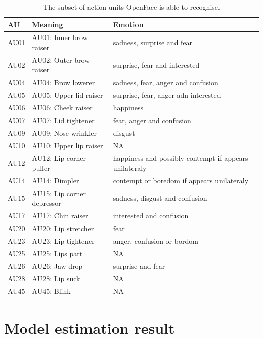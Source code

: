 \documentclass{monashthesis}
\begin{document}
\begin{table}[ht]
\begin{center}
\caption{\label{tab:au} The subset of action units OpenFace is able to recognise.}
\begin{tabular}{lll}
\toprule
AU & Meaning & Emotion \\
\midrule
AU01 & AU01: Inner brow raiser & sadness, surprise and fear \\
AU02 & AU02: Outer brow raiser & surprise, fear and interested \\
AU04 & AU04: Brow lowerer & sadness, fear, anger and confusion \\
AU05 & AU05: Upper lid raiser & surprise, fear, anger adn interested \\
AU06 & AU06: Cheek raiser & happiness \\
AU07 & AU07: Lid tightener & fear, anger and confusion \\
AU09 & AU09: Nose wrinkler & disgust \\
AU10 & AU10: Upper lip raiser & NA \\
AU12 & AU12: Lip corner puller & happiness and possibly contempt if appears unilateraly \\
AU14 & AU14: Dimpler & contempt or boredom if appears unilateraly \\
AU15 & AU15: Lip corner depressor & sadness, disgust and confusion \\
AU17 & AU17: Chin raiser & interested and confusion \\
AU20 & AU20: Lip stretcher & fear \\
AU23 & AU23: Lip tightener & anger, confusion or bordom \\
AU25 & AU25: Lips part & NA \\
AU26 & AU26: Jaw drop & surprise and fear \\
AU28 & AU28: Lip suck & NA \\
AU45 & AU45: Blink & NA \\
\bottomrule
\end{tabular}
\end{center}
\end{table}

\hypertarget{model-estimation-result}{%
\section{Model estimation result}\label{model-estimation-result}}
\end{document}
